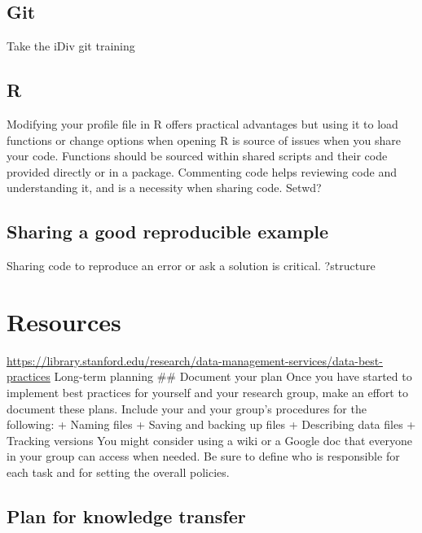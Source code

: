 \documentclass[
]{book}
\begin{document}
\hypertarget{git}{%
\section{Git}\label{git}}

Take the iDiv git training

\hypertarget{r}{%
\section{R}\label{r}}

Modifying your profile file in R offers practical advantages but using it to load functions or change options when opening R is source of issues when you share your code. Functions should be sourced within shared scripts and their code provided directly or in a package.
Commenting code helps reviewing code and understanding it, and is a necessity when sharing code.
Setwd?

\hypertarget{sharing-a-good-reproducible-example}{%
\section{Sharing a good reproducible example}\label{sharing-a-good-reproducible-example}}

Sharing code to reproduce an error or ask a solution is critical.
?structure

\hypertarget{resources}{%
\chapter{Resources}\label{resources}}

\url{https://library.stanford.edu/research/data-management-services/data-best-practices}
Long-term planning
\#\# Document your plan
Once you have started to implement best practices for yourself and your research group, make an effort to document these plans. Include your and your group's procedures for the following:
+ Naming files
+ Saving and backing up files
+ Describing data files
+ Tracking versions
You might consider using a wiki or a Google doc that everyone in your group can access when needed. Be sure to define who is responsible for each task and for setting the overall policies.

\hypertarget{plan-for-knowledge-transfer}{%
\section{Plan for knowledge transfer}\label{plan-for-knowledge-transfer}}
\end{document}
